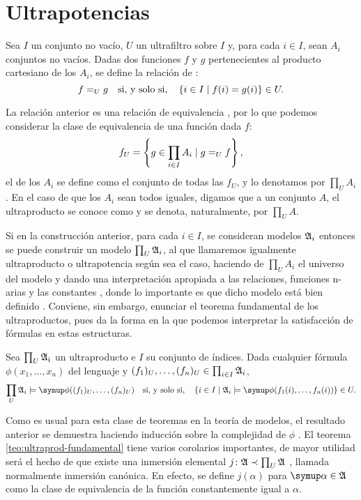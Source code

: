 \section{Ultrapotencias}
Sea $I$ un conjunto no vacío, $U$ un ultrafiltro sobre $I$ y, para cada $i\in I$,
sean $A_i$ conjuntos no vacíos. Dadas dos funciones $f$ y $g$ pertenecientes al producto
cartesiano de los $A_i$, se define la relación de :
\[
    f=_U g \quad\text{si, y solo si,}\quad \left\{ i\in I\mid f(i)=g(i) \right\}\in U.
\]

La relación anterior es una relación de equivalencia \autocite[Proposición 4.1.5]{chang_model_2012},
por lo que podemos considerar la clase de equivalencia de una función dada $f$:
\[
    f_U = \left\{ g\in \prod_{i\in I} A_i\mid g=_U f \right\},
\]
el  de los $A_i$ se define como el conjunto de todas las $f_U$,
y lo denotamos por $\prod_U A_i$. En el caso de que los $A_i$ sean todos iguales, digamos que
a un conjunto $A$, el ultraproducto se conoce como  y se denota, naturalmente,
por $\prod_U A$.

Si en la construcción anterior, para cada $i\in I$, se consideran modelos $\mathfrak { A }_i$ entonces
se puede construir un modelo $\prod_U \mathfrak { A }_i$, al que llamaremos igualmente
ultraproducto o ultrapotencia según sea el caso,
haciendo de $\prod_U A_i$ el universo del modelo y dando una
interpretación apropiada a las relaciones,
funciones n-arias y las constantes \autocite[Definición 4.1.6]{chang_model_2012}, donde lo importante es que
dicho modelo está bien definido \autocite[Proposición 4.1.7]{chang_model_2012}. Conviene, sin embargo, enunciar el teorema fundamental de los
ultraproductos, pues da la forma en la que podemos interpretar la satisfacción de fórmulas
en estas estructuras.
\begin{teo}\label{teo:ultraprod-fundamental}
    Sea $\prod_U \mathfrak { A_i }$ un ultraproducto e $I$ su conjunto de índices.
    Dada cualquier fórmula $\phi(x_1,\dots,x_n)$ del lenguaje y $(f_1)_U,\dots,(f_n)_U\in\prod_{i\in I} \mathfrak { A }_i$,
    \[
        \prod_U \model{A}_i\models\phi((f_1)_U,\dots,(f_n)_U)
        \quad\text{si, y solo si,}\quad
        \set{i\in I\mid \model{A}_i\models\phi(f_1(i),\dots,f_n(i))}\in U.
    \]
\end{teo}

Como es usual para esta clase de teoremas en la teoría de modelos,
el resultado anterior se demuestra haciendo inducción sobre la complejidad
de $\phi$ \autocite[Teorema 4.1.9]{chang_model_2012}.
El teorema \ref{teo:ultraprod-fundamental} tiene varios corolarios importantes, de mayor
utilidad será el hecho de que existe una inmersión elemental
$j\colon \mathfrak { A }\prec\prod_U\mathfrak { A }$ \autocite[Corolario 4.1.13]{chang_model_2012},
llamada normalmente inmersión canónica.
En efecto, se define $j(\alpha)$
para $\alpha\in\model{A}$ como la clase de equivalencia de la función constantemente
igual a $\alpha$.

